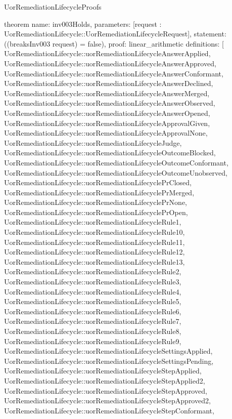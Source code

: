 \begin{lexlean}{UorRemediationLifecycleProofs}
\begin{semanticmodule}
theorem{
  name: inv003Holds,
  parameters: [request : UorRemediationLifecycle::UorRemediationLifecycleRequest],
  statement: ((breaksInv003 request) = false),
  proof: linear_arithmetic{
    definitions: [
      UorRemediationLifecycle::uorRemediationLifecycleAnswerApplied,
      UorRemediationLifecycle::uorRemediationLifecycleAnswerApproved,
      UorRemediationLifecycle::uorRemediationLifecycleAnswerConformant,
      UorRemediationLifecycle::uorRemediationLifecycleAnswerDeclined,
      UorRemediationLifecycle::uorRemediationLifecycleAnswerMerged,
      UorRemediationLifecycle::uorRemediationLifecycleAnswerObserved,
      UorRemediationLifecycle::uorRemediationLifecycleAnswerOpened,
      UorRemediationLifecycle::uorRemediationLifecycleApprovalGiven,
      UorRemediationLifecycle::uorRemediationLifecycleApprovalNone,
      UorRemediationLifecycle::uorRemediationLifecycleJudge,
      UorRemediationLifecycle::uorRemediationLifecycleOutcomeBlocked,
      UorRemediationLifecycle::uorRemediationLifecycleOutcomeConformant,
      UorRemediationLifecycle::uorRemediationLifecycleOutcomeUnobserved,
      UorRemediationLifecycle::uorRemediationLifecyclePrClosed,
      UorRemediationLifecycle::uorRemediationLifecyclePrMerged,
      UorRemediationLifecycle::uorRemediationLifecyclePrNone,
      UorRemediationLifecycle::uorRemediationLifecyclePrOpen,
      UorRemediationLifecycle::uorRemediationLifecycleRule1,
      UorRemediationLifecycle::uorRemediationLifecycleRule10,
      UorRemediationLifecycle::uorRemediationLifecycleRule11,
      UorRemediationLifecycle::uorRemediationLifecycleRule12,
      UorRemediationLifecycle::uorRemediationLifecycleRule13,
      UorRemediationLifecycle::uorRemediationLifecycleRule2,
      UorRemediationLifecycle::uorRemediationLifecycleRule3,
      UorRemediationLifecycle::uorRemediationLifecycleRule4,
      UorRemediationLifecycle::uorRemediationLifecycleRule5,
      UorRemediationLifecycle::uorRemediationLifecycleRule6,
      UorRemediationLifecycle::uorRemediationLifecycleRule7,
      UorRemediationLifecycle::uorRemediationLifecycleRule8,
      UorRemediationLifecycle::uorRemediationLifecycleRule9,
      UorRemediationLifecycle::uorRemediationLifecycleSettingsApplied,
      UorRemediationLifecycle::uorRemediationLifecycleSettingsPending,
      UorRemediationLifecycle::uorRemediationLifecycleStepApplied,
      UorRemediationLifecycle::uorRemediationLifecycleStepApplied2,
      UorRemediationLifecycle::uorRemediationLifecycleStepApproved,
      UorRemediationLifecycle::uorRemediationLifecycleStepApproved2,
      UorRemediationLifecycle::uorRemediationLifecycleStepConformant,
}}
\end{semanticmodule}
\end{lexlean}
